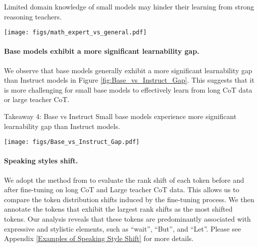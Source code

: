 \begin{AIbox}{} Limited domain knowledge of small models may hinder their learning from strong reasoning teachers.  \end{AIbox}

\begin{figure*}[!t]
    \centering
    \texttt{[image: figs/math\_expert\_vs\_general.pdf]}
    \caption{Math expert models usually have a less significant Learnability Gap than the general models. 
    A positive Gap means long CoT or large teacher CoT is better while negative means worse. This indicates that the math expert model could more easily learn from long CoT data or large teacher CoT. }
    \label{fig:math_expert_vs_general}
\end{figure*}



\paragraph{Base models exhibit a more significant learnability gap.}
We observe that base models generally exhibit a more significant learnability gap than Instruct models in Figure \ref{fig:Base_vs_Instruct_Gap}. 
This suggests that it is more challenging for small base models to effectively learn from long CoT data or large teacher CoT.


\begin{AIbox}{Takeaway 4: Base vs Instruct}
Small base models experience more significant learnability gap than Instruct models.
\end{AIbox}
\begin{figure*}[!t]
    \centering
    \texttt{[image: figs/Base\_vs\_Instruct\_Gap.pdf]}
    \caption{Base models generally exhibit a more significant learnability gap than Instruct models. A positive gap indicates that long CoT data or large teacher CoT enhance performance, whereas a negative gap suggests they have the opposite effect. This implies that it is more challenging for small base models to effectively learn from long CoT data or large teacher CoT.}
    \label{fig:Base_vs_Instruct_Gap}
\end{figure*}





\paragraph{Speaking styles shift.}
We adopt the method from  \citep{lin2023unlockingspellbasellms} to evaluate the rank shift of each token before and after fine-tuning on long CoT and Large teacher CoT data. This allows us to compare the token distribution shifts induced by the fine-tuning process. We then annotate the tokens that exhibit the largest rank shifts as the most shifted tokens. Our analysis reveals that these tokens are predominantly associated with expressive and stylistic elements, such as “wait”, “But”, and “Let”. Please see Appendix \ref{Examples of Speaking Style Shift} for more details.


